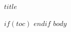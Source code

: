 \documentclass[12pt,a4paper,UTF8]{ctexart}
\begin{document}
\begin{titlepage}
  \centering
  \vspace*{58mm}
  {\Huge\bfseries\color{ContestBlue} $title$\par}
  \vfill
  \vspace*{28mm}
\end{titlepage}
$if(toc)$
\tableofcontents
\clearpage
$endif$
$body$
\end{document}
